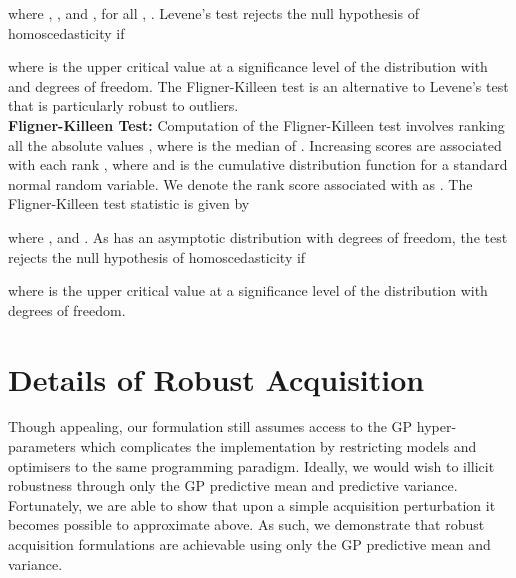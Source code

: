 \documentclass[jair,twoside,11pt,theapa]{article}
\theoremstyle{definition}
\begin{document}
where , ,  and , for all , .
Levene's test rejects the null hypothesis of homoscedasticity  if

where  is the upper critical value at a significance level  of the  distribution with  and  degrees of freedom. The Fligner-Killeen test is an alternative to Levene's test that is particularly robust to outliers.  \\

\noindent \textbf{Fligner-Killeen Test:}
Computation of the Fligner-Killeen test involves ranking all the absolute values , where  is the median of . Increasing scores  are associated with each rank , where  and  is the cumulative distribution function for a standard normal random variable. We denote the rank score associated with  as . The Fligner-Killeen test statistic is given by



\noindent where ,  and . As  has an asymptotic  distribution with  degrees of freedom, the test rejects the null hypothesis of homoscedasticity  if



\noindent where  is the upper critical value at a significance level  of the  distribution with  degrees of freedom.

\section{Details of Robust Acquisition}\label{app:robacq}


Though appealing, our formulation still assumes access to the GP hyper-parameters which complicates the implementation by restricting models and optimisers to the same programming paradigm. Ideally, we would wish to illicit robustness through only the GP predictive mean and predictive variance. Fortunately, we are able to show that upon a simple acquisition perturbation it becomes possible to approximate  above. As such, we demonstrate that robust acquisition formulations are achievable using only the GP predictive mean and variance. \\ 
\end{document}
